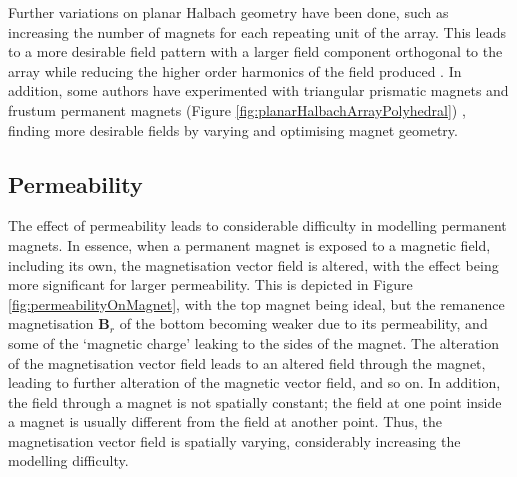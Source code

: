 Further variations on planar Halbach geometry have been done, such as increasing the number of magnets for each repeating unit of the array. This leads to a more desirable field pattern with a larger field component orthogonal to the array while reducing the higher order harmonics of the field produced \cite{Min2010}. In addition, some authors have experimented with triangular prismatic magnets \cite{Cho2001,Cho2002} and frustum permanent magnets (Figure \ref{fig:planarHalbachArrayPolyhedral}) \cite{Peng2013,Janssen2009,Janssen2010a}, finding more desirable fields by varying and optimising magnet geometry.

\subsection{Permeability}
The effect of permeability leads to considerable difficulty in modelling permanent magnets. In essence, when a permanent magnet is exposed to a magnetic field, including its own, the magnetisation vector field is altered, with the effect being more significant for larger permeability. This is depicted in Figure \ref{fig:permeabilityOnMagnet}, with the top magnet being ideal, but the remanence magnetisation \(\mathbf{B}_r\) of the bottom becoming weaker due to its permeability, and some of the `magnetic charge' leaking to the sides of the magnet. The alteration of the magnetisation vector field leads to an altered field through the magnet, leading to further alteration of the magnetic vector field, and so on. In addition, the field through a magnet is not spatially constant; the field at one point inside a magnet is usually different from the field at another point. Thus, the magnetisation vector field is spatially varying, considerably increasing the modelling difficulty.

